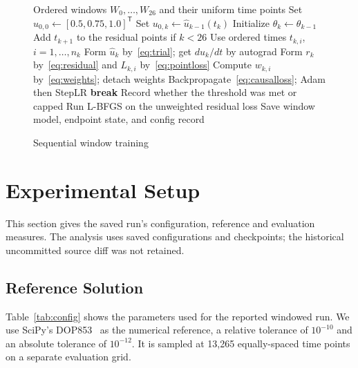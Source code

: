 \documentclass[conference,a4paper]{IEEEtran}
\begin{document}
\begin{figure}[t]
\centering
\begin{minipage}{\columnwidth}
\begin{algorithmic}[1]
\Require Ordered windows $W_0,\ldots,W_{26}$ and their uniform time points
\State Set $u_{0,0}\gets[0.5,0.75,1.0]^\mathsf{T}$
    \State Set $u_{0,k}\gets\hat{u}_{k-1}(t_k)$
    \State Initialize $\theta_k\gets\theta_{k-1}$
  \EndIf
  \State Add $t_{k+1}$ to the residual points if $k<26$
      \State Use ordered times $t_{k,i}$, $i=1,\ldots,n_k$
    \State Form $\hat{u}_k$ by~\eqref{eq:trial}; get $d\hat{u}_k/dt$ by autograd
    \State Form $r_k$ by~\eqref{eq:residual} and $L_{k,i}$ by~\eqref{eq:pointloss}
    \State Compute $w_{k,i}$ by~\eqref{eq:weights}; detach weights
      \State Backpropagate~\eqref{eq:causalloss}; Adam then StepLR
        \State \textbf{break}
      \EndIf
    \EndFor
    \State Record whether the threshold was met or capped
  \EndFor
  \State Run L-BFGS on the unweighted residual loss
  \State Save window model, endpoint state, and config record
\EndFor
\end{algorithmic}
\end{minipage}
\caption{Sequential window training}
\label{fig:training}
\end{figure}



\section{Experimental Setup}

This section gives the saved run's configuration, reference and evaluation measures. The analysis uses saved configurations and checkpoints; the historical uncommitted source diff was not retained.

\subsection{Reference Solution}


Table~\ref{tab:config} shows the parameters used for the reported windowed run. We use SciPy’s DOP853~\cite{virtanen2020} as the numerical reference, a relative tolerance of $10^{-10}$ and an absolute tolerance of $10^{-12}$. It is sampled at 13,265 equally-spaced time points on a separate evaluation grid.
\end{document}
